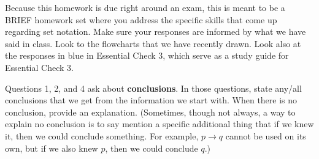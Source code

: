 \documentclass{article}
\begin{document}
\noindent Because this homework is due right around an exam, this is meant to be a BRIEF homework set where you address the specific skills that come up regarding set notation. Make sure your responses are informed by what we have said in class. Look to the flowcharts that we have recently drawn. Look also at the responses in {\color{blue}blue} in Essential Check 3, which serve as a study guide for Essential Check 3.

Questions 1, 2, and 4 ask about {\bf conclusions}. In those questions, state
any/all conclusions that we get from the information we start with. When there
is no conclusion, provide an explanation. (Sometimes, though not always, a way
to explain no conclusion is to say mention a specific additional thing that if
we knew it, then we could conclude something. For example, $p \rightarrow q$
cannot be used on its own, but if we also knew $p$, then we could conclude
$q$.)
\end{document}
